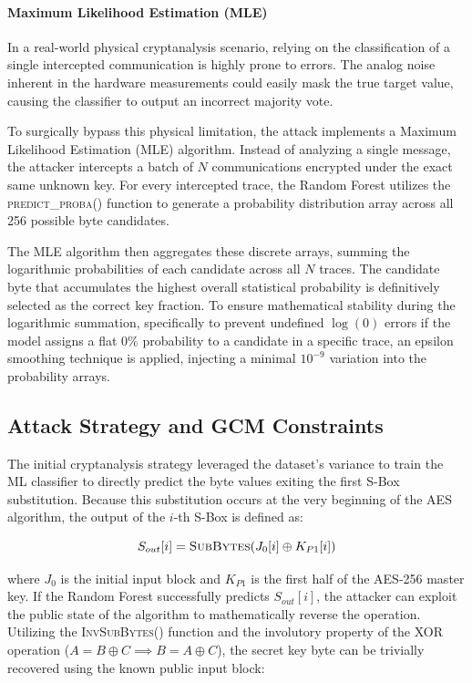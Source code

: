 \documentclass[11pt,a4paper]{report}
\begin{document}
\paragraph{Maximum Likelihood Estimation (MLE)}
In a real-world physical cryptanalysis scenario, relying on the classification of a single intercepted communication is highly prone to errors. 
The analog noise inherent in the hardware measurements could easily mask the true target value, causing the classifier to output an incorrect majority vote. 

To surgically bypass this physical limitation, the attack implements a Maximum Likelihood Estimation (MLE) algorithm. 
Instead of analyzing a single message, the attacker intercepts a batch of $N$ communications encrypted under the exact same unknown key. 
For every intercepted trace, the Random Forest utilizes the \textsc{predict\_proba()} function to generate a probability distribution array across all 256 possible byte candidates. 

The MLE algorithm then aggregates these discrete arrays, summing the logarithmic probabilities of each candidate across all $N$ traces. 
The candidate byte that accumulates the highest overall statistical probability is definitively selected as the correct key fraction. 
To ensure mathematical stability during the logarithmic summation, specifically to prevent undefined $\log(0)$ errors if the model assigns a flat $0\%$ probability to a candidate in a specific trace, 
an epsilon smoothing technique is applied, injecting a minimal $10^{-9}$ variation into the probability arrays.


\subsection{Attack Strategy and GCM Constraints}
The initial cryptanalysis strategy leveraged the dataset's variance to train the ML classifier to directly predict the byte values exiting the first S-Box substitution. 
Because this substitution occurs at the very beginning of the AES algorithm, the output of the $i$-th S-Box is defined as:

\begin{equation}
    S_{out}[i] = \textsc{SubBytes}(J_0[i] \oplus K_{P1}[i])
\end{equation}

where $J_0$ is the initial input block and $K_{P1}$ is the first half of the AES-256 master key. 
If the Random Forest successfully predicts $S_{out}[i]$, the attacker can exploit the public state of the algorithm to mathematically reverse the operation. 
Utilizing the \textsc{InvSubBytes}() function and the involutory property of the XOR operation ($A = B \oplus C \implies B = A \oplus C$), the secret key byte can be trivially recovered using the known public input block:
\end{document}
